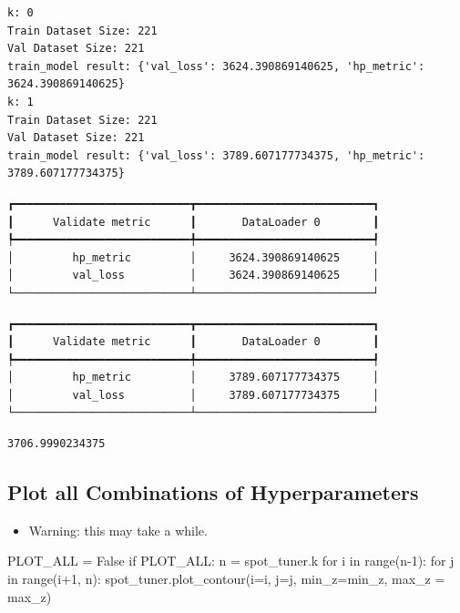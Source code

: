 \documentclass[
  letterpaper,
  DIV=11,
  numbers=noendperiod]{scrreprt}
\newenvironment{Shaded}{\begin{snugshade}}{\end{snugshade}}
\newcommand{\BuiltInTok}[1]{\textcolor[rgb]{0.00,0.23,0.31}{#1}}
\newcommand{\ControlFlowTok}[1]{\textcolor[rgb]{0.00,0.23,0.31}{#1}}
\newcommand{\DecValTok}[1]{\textcolor[rgb]{0.68,0.00,0.00}{#1}}
\newcommand{\KeywordTok}[1]{\textcolor[rgb]{0.00,0.23,0.31}{#1}}
\newcommand{\NormalTok}[1]{\textcolor[rgb]{0.00,0.23,0.31}{#1}}
\newcommand{\OperatorTok}[1]{\textcolor[rgb]{0.37,0.37,0.37}{#1}}
\newcommand{\VariableTok}[1]{\textcolor[rgb]{0.07,0.07,0.07}{#1}}
\providecommand{\tightlist}{%
  \setlength{\itemsep}{0pt}\setlength{\parskip}{0pt}}\usepackage{longtable,booktabs,array}
\begin{document}
\begin{verbatim}
k: 0
Train Dataset Size: 221
Val Dataset Size: 221
train_model result: {'val_loss': 3624.390869140625, 'hp_metric': 3624.390869140625}
k: 1
Train Dataset Size: 221
Val Dataset Size: 221
train_model result: {'val_loss': 3789.607177734375, 'hp_metric': 3789.607177734375}
\end{verbatim}

\begin{verbatim}
┏━━━━━━━━━━━━━━━━━━━━━━━━━━━┳━━━━━━━━━━━━━━━━━━━━━━━━━━━┓
┃      Validate metric      ┃       DataLoader 0        ┃
┡━━━━━━━━━━━━━━━━━━━━━━━━━━━╇━━━━━━━━━━━━━━━━━━━━━━━━━━━┩
│         hp_metric         │     3624.390869140625     │
│         val_loss          │     3624.390869140625     │
└───────────────────────────┴───────────────────────────┘
\end{verbatim}

\begin{verbatim}
┏━━━━━━━━━━━━━━━━━━━━━━━━━━━┳━━━━━━━━━━━━━━━━━━━━━━━━━━━┓
┃      Validate metric      ┃       DataLoader 0        ┃
┡━━━━━━━━━━━━━━━━━━━━━━━━━━━╇━━━━━━━━━━━━━━━━━━━━━━━━━━━┩
│         hp_metric         │     3789.607177734375     │
│         val_loss          │     3789.607177734375     │
└───────────────────────────┴───────────────────────────┘
\end{verbatim}

\begin{verbatim}
3706.9990234375
\end{verbatim}

\subsection{Plot all Combinations of
Hyperparameters}\label{plot-all-combinations-of-hyperparameters}

\begin{itemize}
\tightlist
\item
  Warning: this may take a while.
\end{itemize}

\begin{Shaded}
\begin{Highlighting}[]
\NormalTok{PLOT\_ALL }\OperatorTok{=} \VariableTok{False}
\ControlFlowTok{if}\NormalTok{ PLOT\_ALL:}
\NormalTok{    n }\OperatorTok{=}\NormalTok{ spot\_tuner.k}
    \ControlFlowTok{for}\NormalTok{ i }\KeywordTok{in} \BuiltInTok{range}\NormalTok{(n}\OperatorTok{{-}}\DecValTok{1}\NormalTok{):}
        \ControlFlowTok{for}\NormalTok{ j }\KeywordTok{in} \BuiltInTok{range}\NormalTok{(i}\OperatorTok{+}\DecValTok{1}\NormalTok{, n):}
\NormalTok{            spot\_tuner.plot\_contour(i}\OperatorTok{=}\NormalTok{i, j}\OperatorTok{=}\NormalTok{j, min\_z}\OperatorTok{=}\NormalTok{min\_z, max\_z }\OperatorTok{=}\NormalTok{ max\_z)}
\end{Highlighting}
\end{Shaded}
\end{document}
